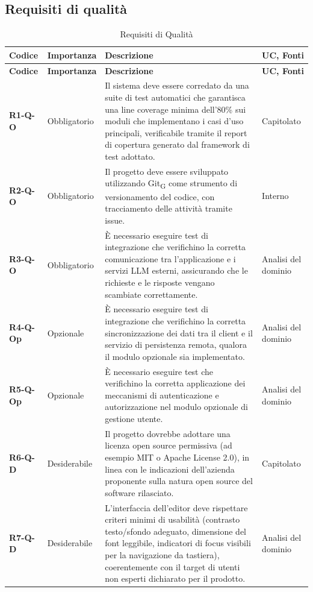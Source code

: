\subsection{Requisiti di qualità}
\begin{longtable}{|p{2.5cm}|p{2.2cm}|p{6.8cm}|p{2.7cm}|}
	\caption{Requisiti di Qualità} \\
	\hline
	\rowcolor{primarycolor!10}
	\textbf{Codice} & \textbf{Importanza} & \textbf{Descrizione} & \textbf{UC, Fonti} \\
	\hline
	\endfirsthead
	\hline
	\rowcolor{primarycolor!10}
	\textbf{Codice} & \textbf{Importanza} & \textbf{Descrizione} & \textbf{UC, Fonti} \\
	\hline
	\endhead

	\textbf{R1-Q-O} & Obbligatorio & Il sistema deve essere corredato da una suite di test automatici che garantisca una line coverage minima dell'80\% sui moduli che implementano i casi d'uso principali, verificabile tramite il report di copertura generato dal framework di test adottato. & Capitolato \\ \hline
	\textbf{R2-Q-O} & Obbligatorio & Il progetto deve essere sviluppato utilizzando Git\textsubscript{G} come strumento di versionamento del codice, con tracciamento delle attività tramite issue. & Interno \\ \hline
	\textbf{R3-Q-O} & Obbligatorio & È necessario eseguire test di integrazione che verifichino la corretta comunicazione tra l'applicazione e i servizi LLM esterni, assicurando che le richieste e le risposte vengano scambiate correttamente. & Analisi del dominio \\ \hline
	\textbf{R4-Q-Op} & Opzionale & È necessario eseguire test di integrazione che verifichino la corretta sincronizzazione dei dati tra il client e il servizio di persistenza remota, qualora il modulo opzionale sia implementato. & Analisi del dominio \\ \hline
	\textbf{R5-Q-Op} & Opzionale & È necessario eseguire test che verifichino la corretta applicazione dei meccanismi di autenticazione e autorizzazione nel modulo opzionale di gestione utente. & Analisi del dominio \\ \hline
	\textbf{R6-Q-D} & Desiderabile & Il progetto dovrebbe adottare una licenza open source permissiva (ad esempio MIT o Apache License 2.0), in linea con le indicazioni dell'azienda proponente sulla natura open source del software rilasciato. & Capitolato \\ \hline

	\textbf{R7-Q-D} & Desiderabile & L'interfaccia dell'editor deve rispettare criteri minimi di usabilità (contrasto testo/sfondo adeguato, dimensione del font leggibile, indicatori di focus visibili per la navigazione da tastiera), coerentemente con il target di utenti non esperti dichiarato per il prodotto. & Analisi del dominio \\ \hline


\end{longtable}
